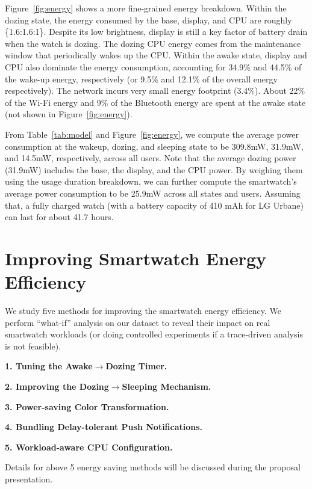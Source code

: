 Figure~\ref{fig:energy} shows a more fine-grained energy breakdown. Within the dozing state, the energy consumed by the base, display, and CPU are roughly \{1.6:1.6:1\}. Despite its low brightness, display is still a key factor of battery drain when the watch is dozing. The dozing CPU energy comes from the maintenance window that periodically wakes up the CPU.
Within the awake state, display and CPU also dominate the energy consumption, accounting for 34.9\% and 44.5\% of the wake-up energy, respectively (or 9.5\% and 12.1\% of the overall energy respectively). The network incurs very small energy footprint (3.4\%). About 22\% of the Wi-Fi energy and 9\% of the Bluetooth energy are spent at the awake state (not shown in Figure~\ref{fig:energy}).

From Table~\ref{tab:model} and Figure~\ref{fig:energy}, we compute the average power consumption at the wakeup, dozing, and sleeping state to be 309.8mW, 31.9mW, and 14.5mW, respectively, across all users.
Note that the average dozing power (31.9mW) includes the base, the display, and the CPU power.
By weighing them using the usage duration breakdown, we can further compute the smartwatch's average power consumption to be 25.9mW across all states and users. Assuming that, a fully charged watch (with a battery capacity of 410 mAh for LG Urbane) can last for about 41.7 hours.


\section{Improving Smartwatch Energy Efficiency}
We study five methods for improving the smartwatch energy efficiency. We perform “what-if” analysis
on our dataset to reveal their impact on real smartwatch workloads
(or doing controlled experiments if a trace-driven analysis is not
feasible).

\textbf{1. Tuning the Awake$\rightarrow$Dozing Timer.} 

\textbf{2. Improving the Dozing$\rightarrow$Sleeping Mechanism.}

\textbf{3. Power-saving Color Transformation.}

\textbf{4. Bundling Delay-tolerant Push Notifications.} 

\textbf{5. Workload-aware CPU Configuration.}

Details for above 5 energy saving methods will be discussed during the proposal presentation.